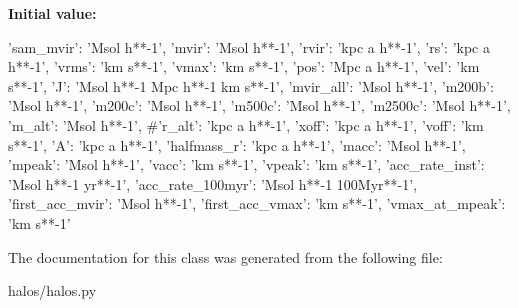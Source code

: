\label{classseren3_1_1halos_1_1halos_1_1RockstarCatalogue_abbae8e93c0213ede835686f60bda9770}
{\bfseries Initial value:}
\begin{DoxyCode}
{'sam_mvir': 'Msol h**-1',
        'mvir': 'Msol h**-1',
        'rvir': 'kpc a h**-1',
        'rs': 'kpc a h**-1',
        'vrms': 'km s**-1',
        'vmax': 'km s**-1',
        'pos': 'Mpc a h**-1',
        'vel': 'km s**-1',
        'J': 'Msol h**-1 Mpc h**-1 km s**-1',
        'mvir_all': 'Msol h**-1',
        'm200b': 'Msol h**-1',
        'm200c': 'Msol h**-1',
        'm500c': 'Msol h**-1',
        'm2500c': 'Msol h**-1',
        'm_alt': 'Msol h**-1',
        #'r_alt': 'kpc a h**-1',
        'xoff': 'kpc a h**-1',
        'voff': 'km s**-1',
        'A': 'kpc a h**-1',
        'halfmass_r': 'kpc a h**-1',
        'macc': 'Msol h**-1',
        'mpeak': 'Msol h**-1',
        'vacc': 'km s**-1',
        'vpeak': 'km s**-1',
        'acc_rate_inst': 'Msol h**-1 yr**-1',
        'acc_rate_100myr': 'Msol h**-1 100Myr**-1',
        'first_acc_mvir': 'Msol h**-1',
        'first_acc_vmax': 'km s**-1',
        'vmax_at_mpeak': 'km s**-1'}
\end{DoxyCode}


The documentation for this class was generated from the following file:\begin{DoxyCompactItemize}
\item 
halos/halos.py\end{DoxyCompactItemize}

